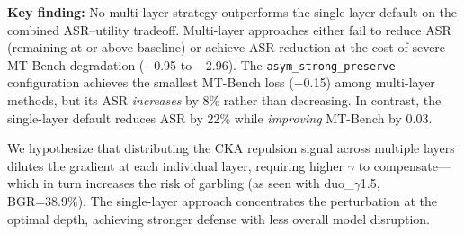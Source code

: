 \noindent \textbf{Key finding:} No multi-layer strategy outperforms the single-layer default on the combined ASR--utility tradeoff. Multi-layer approaches either fail to reduce ASR (remaining at or above baseline) or achieve ASR reduction at the cost of severe MT-Bench degradation ($-$0.95 to $-$2.96). The \texttt{asym\_strong\_preserve} configuration achieves the smallest MT-Bench loss ($-$0.15) among multi-layer methods, but its ASR \emph{increases} by 8\% rather than decreasing. In contrast, the single-layer default reduces ASR by 22\% while \emph{improving} MT-Bench by 0.03.

We hypothesize that distributing the CKA repulsion signal across multiple layers dilutes the gradient at each individual layer, requiring higher $\gamma$ to compensate---which in turn increases the risk of garbling (as seen with duo\_$\gamma$1.5, BGR=38.9\%). The single-layer approach concentrates the perturbation at the optimal depth, achieving stronger defense with less overall model disruption.
